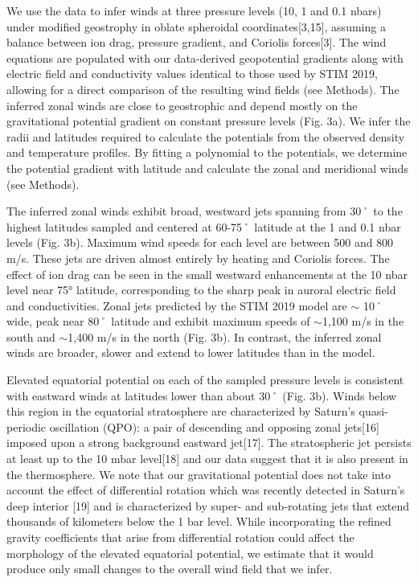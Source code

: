 We use the data to infer winds at three pressure levels (10, 1 and 0.1 nbars) under modified geostrophy in oblate spheroidal coordinates[3,15], assuming a balance between ion drag, pressure gradient, and Coriolis forces[3]. The wind equations are populated with our data-derived geopotential gradients along with electric field and conductivity values identical to those used by STIM 2019, allowing for a direct comparison of the resulting wind fields (see Methods). The inferred zonal winds are close to geostrophic and depend mostly on the gravitational potential gradient on constant pressure levels (Fig. 3a). We infer the radii and latitudes required to calculate the potentials from the observed density and temperature profiles. By fitting a polynomial to the potentials, we determine the potential gradient with latitude and calculate the zonal and meridional winds (see Methods).

The inferred zonal winds exhibit broad, westward jets spanning from 30˚ to the highest latitudes sampled and centered at 60-75˚ latitude at the 1 and 0.1 nbar levels (Fig. 3b). Maximum wind speeds for each level are between 500 and 800 m/s. These jets are driven almost entirely by heating and Coriolis forces. The effect of ion drag can be seen in the small westward enhancements at the 10 nbar level near 75° latitude, corresponding to the sharp peak in auroral electric field and conductivities. Zonal jets predicted by the STIM 2019 model are $\sim$ 10˚ wide, peak near 80˚ latitude and exhibit maximum speeds of $\sim$1,100 m/s in the south and $\sim$1,400 m/s in the north (Fig. 3b). In contrast, the inferred zonal winds are broader, slower and extend to lower latitudes than in the model.

Elevated equatorial potential on each of the sampled pressure levels is consistent with eastward winds at latitudes lower than about 30˚ (Fig. 3b). Winds below this region in the equatorial stratosphere are characterized by Saturn’s quasi-periodic oscillation (QPO): a pair of descending and opposing zonal jets[16] imposed upon a strong background eastward jet[17]. The stratospheric jet persists at least up to the 10 mbar level[18] and our data suggest that it is also present in the thermosphere. We note that our gravitational potential does not take into account the effect of differential rotation which was recently detected in Saturn’s deep interior [19] and is characterized by super- and sub-rotating jets that extend thousands of kilometers below the 1 bar level. While incorporating the refined gravity coefficients that arise from differential rotation could affect the morphology of the elevated equatorial potential, we estimate that it would produce only small changes to the overall wind field that we infer.

